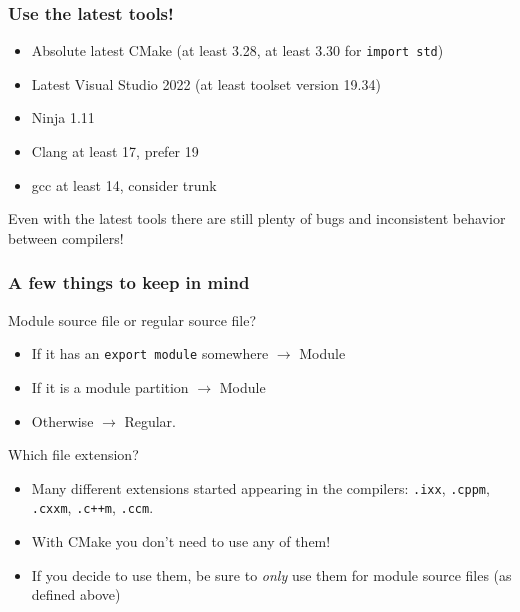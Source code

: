 \documentclass[aspectratio=169]{beamer}
\newif\iftransitions
\newcommand{\cpause}{\iftransitions \pause \fi}
\begin{document}
\begin{frame}
  \frametitle{Use the latest tools!}

  \begin{itemize}
  \item Absolute latest CMake (at least 3.28, at least 3.30 for \texttt{import std})
  \item Latest Visual Studio 2022 (at least toolset version 19.34)
  \item Ninja 1.11
  \item Clang at least 17, prefer 19
  \item gcc at least 14, consider trunk
  \end{itemize}

  Even with the latest tools there are still plenty of bugs and inconsistent behavior between compilers!
\end{frame}


\begin{frame}[fragile]

  \frametitle{A few things to keep in mind}

  Module source file or regular source file?
  \begin{itemize}
  \item If it has an \texttt{export module} somewhere $\rightarrow$ Module
  \item If it is a module partition $\rightarrow$ Module
  \item Otherwise $\rightarrow$ Regular.
  \end{itemize}

  \cpause
  Which file extension?
  \begin{itemize}
  \item Many different extensions started appearing in the compilers: \texttt{.ixx}, \texttt{.cppm}, \texttt{.cxxm}, \texttt{.c++m}, \texttt{.ccm}.
  \item With CMake you don't need to use any of them!
  \item If you decide to use them, be sure to \textit{only} use them for module source files (as defined above)
  \end{itemize}

\end{frame}
\end{document}
